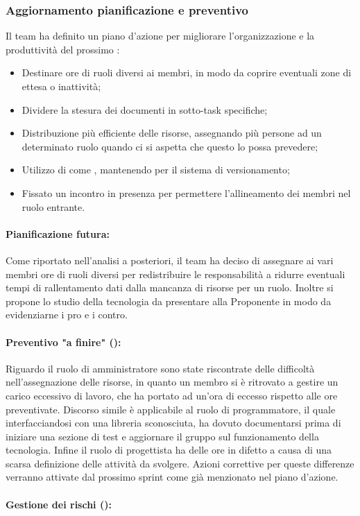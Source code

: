 \subsubsection{Aggiornamento pianificazione e preventivo}
\par Il team ha definito un piano d'azione per migliorare l'organizzazione e la produttività del prossimo :
\begin{itemize}
  \item Destinare ore di ruoli diversi ai membri, in modo da coprire eventuali zone di ettesa o inattività;
  \item Dividere la stesura dei documenti in sotto-task specifiche;
  \item Distribuzione più efficiente delle risorse, assegnando più persone ad un determinato ruolo quando ci si aspetta che questo lo possa prevedere;
  \item Utilizzo di  come , mantenendo  per il sistema di versionamento;
  \item Fissato un incontro in presenza per permettere l'allineamento dei membri nel ruolo entrante.
\end{itemize}

\paragraph*{Pianificazione futura:}
\par Come riportato nell'analisi a posteriori, il team ha deciso di assegnare ai vari membri ore di ruoli diversi per redistribuire le responsabilità a ridurre eventuali tempi di rallentamento dati dalla mancanza di risorse per un ruolo. Inoltre si propone lo studio della tecnologia  da presentare alla Proponente in modo da evidenziarne i pro e i contro.

\paragraph*{Preventivo "a finire" ():}
\par Riguardo il ruolo di amministratore sono state riscontrate delle difficoltà nell'assegnazione delle risorse, in quanto un membro si è ritrovato a gestire un carico eccessivo di lavoro, che ha portato ad un'ora di eccesso rispetto alle ore preventivate. Discorso simile è applicabile al ruolo di programmatore, il quale interfacciandosi con una libreria sconosciuta, ha dovuto documentarsi prima di iniziare una sezione di test e aggiornare il gruppo sul funzionamento della tecnologia. Infine il ruolo di progettista ha delle ore in difetto a causa di una scarsa definizione delle attività da svolgere. Azioni correttive per queste differenze verranno attivate dal prossimo sprint come già menzionato nel piano d'azione.

\paragraph*{Gestione dei rischi ():}

